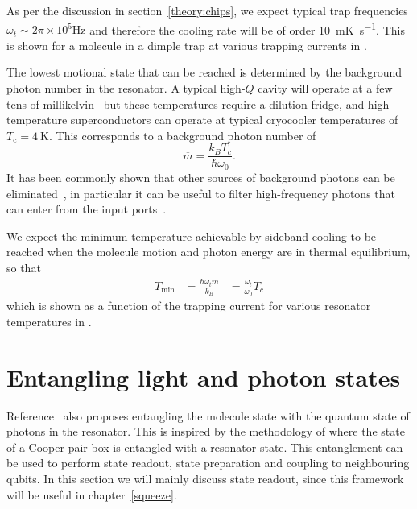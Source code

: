 As per the discussion in section~\ref{theory:chips}, we expect typical trap
frequencies $\omega_t\sim 2\pi \times 10^5 \si{\hertz}$ and therefore the
cooling rate will be of order \SI{10}{\milli\kelvin\per\second}. This is shown
for a molecule in a dimple trap  at various trapping currents in
.

The lowest motional state that can be reached is determined by the background
photon number in the resonator. A typical high-$Q$ cavity will operate at a few
tens of millikelvin~\cite{doi:10.1063/1.3010859} but these temperatures require
a dilution fridge, and high-temperature superconductors can operate at typical
cryocooler temperatures of $T_\text{c}=\SI{4}{\kelvin}$. This corresponds
to a background photon number of
%
\begin{equation}
  \overline{m} = \frac{k_B T_c}{\hbar \omega_0}.
\end{equation}
%
It has been commonly shown that other sources of background photons can be
eliminated~\cite{Wallraff2004}, in particular it can be useful to filter
high-frequency photons that can enter from the input
ports~\cite{doi:10.1063/1.3638063}. 

We expect the minimum temperature achievable by sideband cooling to be reached
when the molecule motion and photon energy are in thermal equilibrium, so that
%
\begin{align}
  T_\text{min} &= \frac{\hbar \omega_t \overline{m}}{k_B}
               &= \frac{\omega_t}{\omega_0}T_c
\end{align}
%
which is shown as a function of the trapping current for various resonator
temperatures in .

\section{Entangling light and photon states}

Reference~\cite{Andre2006} also proposes entangling the molecule state with the
quantum state of photons in the resonator. This is inspired by the methodology
of  where the state of a Cooper-pair box is
entangled with a resonator state. This entanglement can be used to perform
state readout, state preparation and coupling to neighbouring qubits. In this
section we will mainly discuss state readout, since this framework will be
useful in chapter~\ref{squeeze}.

